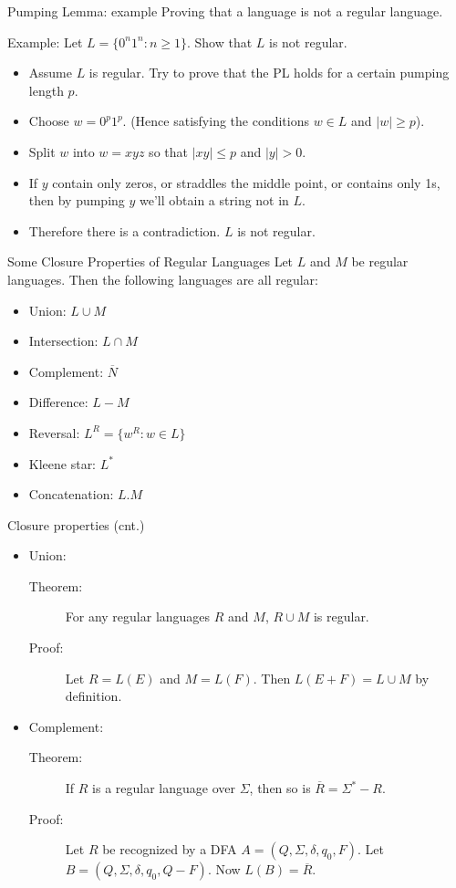 \documentclass{prosper}%
\newcommand{\sg}{{\mbox{$\Sigma$}}}
\begin{document}
\begin{slide}{Pumping Lemma: example}
Proving that a language is not a regular language.

Example: Let $L=\{0^n1^n: n\geq 1\}$. Show that $L$ is not regular.
\begin{itemize}
\item Assume $L$ is regular. Try to prove that the PL holds for a certain pumping length  $p$.
\item  Choose $w=0^p1^p$. (Hence satisfying the conditions $w\in L$ and $|w|\geq p$).
\item Split $w$ into $w=xyz$ so that $|xy| \leq p$ and $|y|>0$.
\item If $y$ contain only zeros, or straddles the middle point, or contains only 1s, then by pumping $y$ we'll obtain a string not in $L$.
\item Therefore there is a contradiction. $L$ is not regular.
\end{itemize}
\end{slide}

\begin{slide}{\large Some Closure Properties of Regular Languages}
Let $L$ and $M$ be regular languages. Then the following languages are all regular:
\begin{itemize}
\item Union: $L\cup M$
\item Intersection: $L\cap M$
\item Complement: $\overline{N}$
\item Difference: $L-M$
\item Reversal: $L^R =\{w^R :w\in L\}$
\item Kleene star: $L^*$
\item Concatenation: $L.M$
\end{itemize}
\end{slide}


\begin{slide}{Closure properties (cnt.)}
\begin{itemize}
\item {\blue Union}:
\begin{description}
\item[Theorem:] For any regular languages $R$ and $M$, $R\cup M$ is regular.
\item[Proof:] Let $R = L(E)$ and $M = L(F)$. Then $L(E+F)=L\cup M$ by definition.
\end{description}
\item Complement:
\begin{description}
\item[Theorem:] If $R$ is a regular language over \sg, then so is $\overline{R}=\sg^*-R$.
\item[Proof:] Let $R$ be recognized by a DFA $A = (Q,\sg,\delta,q_0,F)$.
Let $B=(Q,\sg,\delta,q_0,Q-F)$. Now $L(B)=\overline{R}$.
\end{description}
\end{itemize}
\end{slide}
\end{document}
